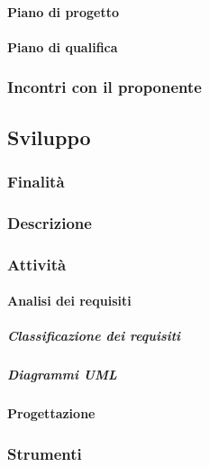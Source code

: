 \documentclass[../norme-di-progetto.tex]{subfiles}
\begin{document}
\paragraph{Piano di progetto}
\label{par:piano di progetto}
\paragraph{Piano di qualifica}
\label{par:piano di qualifica}
\subsubsection{Incontri con il proponente}
\label{subs:incontri con il proponente}
\subsection{Sviluppo}
\label{sub:sviluppo}
\subsubsection{Finalità}
\label{subs:finalità}
\subsubsection{Descrizione}
\label{subs:descrizione}
\subsubsection{Attività}
\label{subs:attività}
\paragraph{Analisi dei requisiti}
\label{par:analisi dei requisiti}
\subparagraph{Classificazione dei requisiti}
\label{subp:classificazione dei requisiti}
\subparagraph{Diagrammi UML}
\label{subp:diagrammi UML}
\paragraph{Progettazione}
\label{par:progettazione}
\subsubsection{Strumenti}
\label{subs:strumnti}
\end{document}
